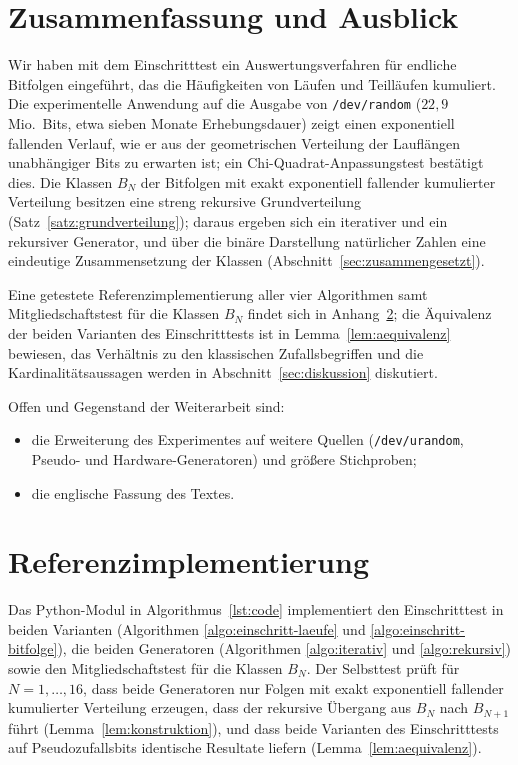 \documentclass[11pt,a4paper]{scrartcl}
\theoremstyle{plain}
\theoremstyle{definition}
\theoremstyle{remark}
\begin{document}
\section{Zusammenfassung und Ausblick}\label{sec:schluss}

Wir haben mit dem Einschritttest ein Auswertungsverfahren für endliche
Bitfolgen eingeführt, das die Häufigkeiten von Läufen und Teilläufen
kumuliert. Die experimentelle Anwendung auf die Ausgabe von
\texttt{/dev/random} ($22,9$ Mio.\ Bits, etwa sieben Monate
Erhebungsdauer) zeigt einen exponentiell fallenden Verlauf, wie er aus
der geometrischen Verteilung der Lauflängen unabhängiger Bits zu
erwarten ist; ein Chi-Quadrat-Anpassungstest bestätigt dies. Die
Klassen $B_N$ der Bitfolgen mit exakt exponentiell fallender
kumulierter Verteilung besitzen eine streng rekursive
Grundverteilung (Satz~\ref{satz:grundverteilung}); daraus ergeben sich
ein iterativer und ein rekursiver Generator, und über die binäre
Darstellung natürlicher Zahlen eine eindeutige Zusammensetzung der
Klassen (Abschnitt~\ref{sec:zusammengesetzt}).

Eine getestete Referenzimplementierung aller vier Algorithmen samt
Mitgliedschaftstest für die Klassen $B_N$ findet sich in
Anhang~\ref{sec:code}; die Äquivalenz der beiden Varianten des
Einschritttests ist in Lemma~\ref{lem:aequivalenz} bewiesen, das
Verhältnis zu den klassischen Zufallsbegriffen und die
Kardinalitätsaussagen werden in Abschnitt~\ref{sec:diskussion}
diskutiert.

Offen und Gegenstand der Weiterarbeit sind:
\begin{itemize}
  \item die Erweiterung des Experimentes auf weitere Quellen
        (\texttt{/dev/urandom}, Pseudo- und Hardware-Generatoren) und
        größere Stichproben;
  \item die englische Fassung des Textes.
\end{itemize}

\appendix
\section{Referenzimplementierung}\label{sec:code}

Das Python-Modul in Algorithmus~\ref{lst:code} implementiert den
Einschritttest in beiden Varianten (Algorithmen
\ref{algo:einschritt-laeufe} und \ref{algo:einschritt-bitfolge}), die
beiden Generatoren (Algorithmen \ref{algo:iterativ} und
\ref{algo:rekursiv}) sowie den Mitgliedschaftstest für die Klassen
$B_N$. Der Selbsttest prüft für $N=1,\dots,16$, dass beide Generatoren
nur Folgen mit exakt exponentiell fallender kumulierter Verteilung
erzeugen, dass der rekursive Übergang aus $B_N$ nach $B_{N+1}$ führt
(Lemma~\ref{lem:konstruktion}), und dass beide Varianten des
Einschritttests auf Pseudozufallsbits identische Resultate liefern
(Lemma~\ref{lem:aequivalenz}).



\printbibliography[title={Literaturverzeichnis}]
\end{document}
